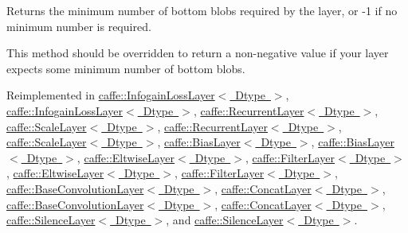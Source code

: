 Returns the minimum number of bottom blobs required by the layer, or -\/1 if no minimum number is required. 

This method should be overridden to return a non-\/negative value if your layer expects some minimum number of bottom blobs. 

Reimplemented in \mbox{\hyperlink{classcaffe_1_1_infogain_loss_layer_ad8a1ef702a695e379e5d0450369b4a0c}{caffe\+::\+Infogain\+Loss\+Layer$<$ Dtype $>$}}, \mbox{\hyperlink{classcaffe_1_1_infogain_loss_layer_ad8a1ef702a695e379e5d0450369b4a0c}{caffe\+::\+Infogain\+Loss\+Layer$<$ Dtype $>$}}, \mbox{\hyperlink{classcaffe_1_1_recurrent_layer_ac31b705bc02d333ae768f7c2184fbfae}{caffe\+::\+Recurrent\+Layer$<$ Dtype $>$}}, \mbox{\hyperlink{classcaffe_1_1_scale_layer_a12c10840f0fc3327854864a12054beb2}{caffe\+::\+Scale\+Layer$<$ Dtype $>$}}, \mbox{\hyperlink{classcaffe_1_1_recurrent_layer_ac31b705bc02d333ae768f7c2184fbfae}{caffe\+::\+Recurrent\+Layer$<$ Dtype $>$}}, \mbox{\hyperlink{classcaffe_1_1_scale_layer_a12c10840f0fc3327854864a12054beb2}{caffe\+::\+Scale\+Layer$<$ Dtype $>$}}, \mbox{\hyperlink{classcaffe_1_1_bias_layer_ab75a2e05bbb1eb37bed5995288143f67}{caffe\+::\+Bias\+Layer$<$ Dtype $>$}}, \mbox{\hyperlink{classcaffe_1_1_bias_layer_ab75a2e05bbb1eb37bed5995288143f67}{caffe\+::\+Bias\+Layer$<$ Dtype $>$}}, \mbox{\hyperlink{classcaffe_1_1_eltwise_layer_a802079d89e0f007c15b39e0c1fb0d275}{caffe\+::\+Eltwise\+Layer$<$ Dtype $>$}}, \mbox{\hyperlink{classcaffe_1_1_filter_layer_af4c97961e859653ef0fa21d796af0259}{caffe\+::\+Filter\+Layer$<$ Dtype $>$}}, \mbox{\hyperlink{classcaffe_1_1_eltwise_layer_a802079d89e0f007c15b39e0c1fb0d275}{caffe\+::\+Eltwise\+Layer$<$ Dtype $>$}}, \mbox{\hyperlink{classcaffe_1_1_filter_layer_af4c97961e859653ef0fa21d796af0259}{caffe\+::\+Filter\+Layer$<$ Dtype $>$}}, \mbox{\hyperlink{classcaffe_1_1_base_convolution_layer_aa3d861ed15f6e41c6257d6a10defa7eb}{caffe\+::\+Base\+Convolution\+Layer$<$ Dtype $>$}}, \mbox{\hyperlink{classcaffe_1_1_concat_layer_a314de9eb00a296ffd3cf84120bd1601e}{caffe\+::\+Concat\+Layer$<$ Dtype $>$}}, \mbox{\hyperlink{classcaffe_1_1_base_convolution_layer_aa3d861ed15f6e41c6257d6a10defa7eb}{caffe\+::\+Base\+Convolution\+Layer$<$ Dtype $>$}}, \mbox{\hyperlink{classcaffe_1_1_concat_layer_a314de9eb00a296ffd3cf84120bd1601e}{caffe\+::\+Concat\+Layer$<$ Dtype $>$}}, \mbox{\hyperlink{classcaffe_1_1_silence_layer_af916fa4138f5d8761ec4490588eeccd1}{caffe\+::\+Silence\+Layer$<$ Dtype $>$}}, and \mbox{\hyperlink{classcaffe_1_1_silence_layer_af916fa4138f5d8761ec4490588eeccd1}{caffe\+::\+Silence\+Layer$<$ Dtype $>$}}.

